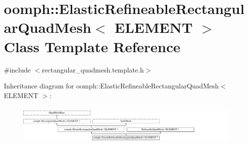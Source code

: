 \hypertarget{classoomph_1_1ElasticRefineableRectangularQuadMesh}{}\section{oomph\+:\+:Elastic\+Refineable\+Rectangular\+Quad\+Mesh$<$ E\+L\+E\+M\+E\+NT $>$ Class Template Reference}
\label{classoomph_1_1ElasticRefineableRectangularQuadMesh}


{\ttfamily \#include $<$rectangular\+\_\+quadmesh.\+template.\+h$>$}

Inheritance diagram for oomph\+:\+:Elastic\+Refineable\+Rectangular\+Quad\+Mesh$<$ E\+L\+E\+M\+E\+NT $>$\+:\begin{figure}[H]
\begin{center}
\leavevmode
\includegraphics[height=2.007169cm]{classoomph_1_1ElasticRefineableRectangularQuadMesh}
\end{center}
\end{figure}
